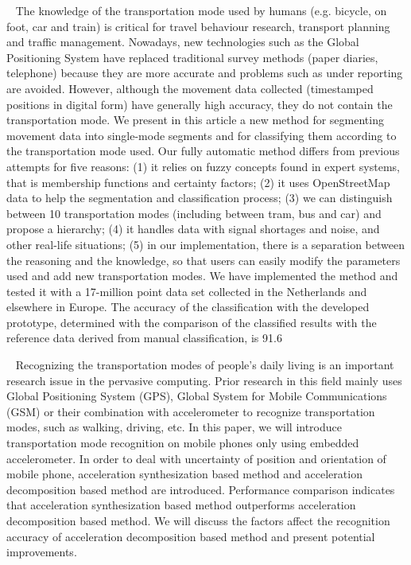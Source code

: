 ~\cite{biljecki2013transportation}
The knowledge of the transportation mode used by humans (e.g. bicycle, on foot, car and train) is critical for travel behaviour research, transport planning and traffic management. Nowadays, new technologies such as the Global Positioning System have replaced traditional survey methods (paper diaries, telephone) because they are more accurate and problems such as under reporting are avoided. However, although the movement data collected (timestamped positions in digital form) have generally high accuracy, they do not contain the transportation mode. We present in this article a new method for segmenting movement data into single-mode segments and for classifying them according to the transportation mode used. Our fully automatic method differs from previous attempts for five reasons: (1) it relies on fuzzy concepts found in expert systems, that is membership functions and certainty factors; (2) it uses OpenStreetMap data to help the segmentation and classification process; (3) we can distinguish between 10 transportation modes (including between tram, bus and car) and propose a hierarchy; (4) it handles data with signal shortages and noise, and other real-life situations; (5) in our implementation, there is a separation between the reasoning and the knowledge, so that users can easily modify the parameters used and add new transportation modes. We have implemented the method and tested it with a 17-million point data set collected in the Netherlands and elsewhere in Europe. The accuracy of the classification with the developed prototype, determined with the comparison of the classified results with the reference data derived from manual classification, is 91.6%

~\cite{wang2010accelerometer}
Recognizing the transportation modes of people’s daily living is an important research issue in the pervasive computing. Prior research in this field mainly uses Global Positioning System (GPS), Global System for Mobile Communications (GSM) or their combination with accelerometer to recognize transportation modes, such as walking, driving, etc. In this paper, we will introduce transportation mode recognition on mobile phones only using embedded accelerometer. In order to deal with uncertainty of position and orientation of mobile phone, acceleration synthesization based method and acceleration decomposition based method are introduced. Performance comparison indicates that acceleration synthesization based method outperforms acceleration decomposition based method. We will discuss the factors affect the recognition accuracy of acceleration decomposition based method and present potential improvements.

